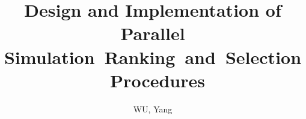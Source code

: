 \title{Design and Implementation of Parallel Simulation~Ranking~and~Selection~Procedures}
\author{WU, Yang}

\pagestyle{plain}
\titlepge
\ifcopyright\copyrightpage\fi
\setcounter{page}{1}
